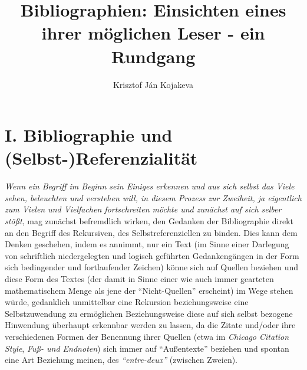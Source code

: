 \documentclass[a4paper,
fontsize=11pt,
oneside,
numbers=noperiodatend,
parskip=half-,
bibliography=totoc,
final
]{scrartcl}
\title{\LARGE{Bibliographien: Einsichten eines ihrer möglichen Leser - ein Rundgang
}} %
\author{Krisztof Ján Kojakeva} %
\date{}
\begin{document}
\maketitle
\thispagestyle{fancyplain} 


\section*{I. Bibliographie und
(Selbst-)Referenzialität}\label{i.-bibliographie-und-selbst-referenzialituxe4t}

\emph{Wenn ein Begriff im Beginn sein Einiges erkennen und aus sich
selbst das Viele sehen, beleuchten und verstehen will, in diesem Prozess
zur Zweiheit, ja eigentlich zum Vielen und Vielfachen fortschreiten
möchte und zunächst auf sich selber stößt}, mag zunächst befremdlich
wirken, den Gedanken der Bibliographie direkt an den Begriff des
Rekursiven, des Selbstreferenziellen zu binden. Dies kann dem Denken
geschehen, indem es annimmt, nur ein Text (im Sinne einer Darlegung von
schriftlich niedergelegten und logisch geführten Gedankengängen in der
Form sich bedingender und fortlaufender Zeichen) könne sich auf Quellen
beziehen und diese Form des Textes (der damit in Sinne einer wie auch
immer gearteten mathematischem Menge als jene der
\enquote{Nicht-Quellen} erscheint) im Wege stehen würde, gedanklich
unmittelbar eine Rekursion beziehungsweise eine Selbstzuwendung zu
ermöglichen Beziehungsweise diese auf sich selbst bezogene Hinwendung
überhaupt erkennbar werden zu lassen, da die Zitate und/oder ihre
verschiedenen Formen der Benennung ihrer Quellen (etwa im \emph{Chicago
Citation Style}, \emph{Fuß- und Endnoten}) sich immer auf
\enquote{Außentexte} beziehen und spontan eine Art Beziehung meinen, des
\emph{\enquote{entre-deux}} (zwischen Zweien).
\end{document}
